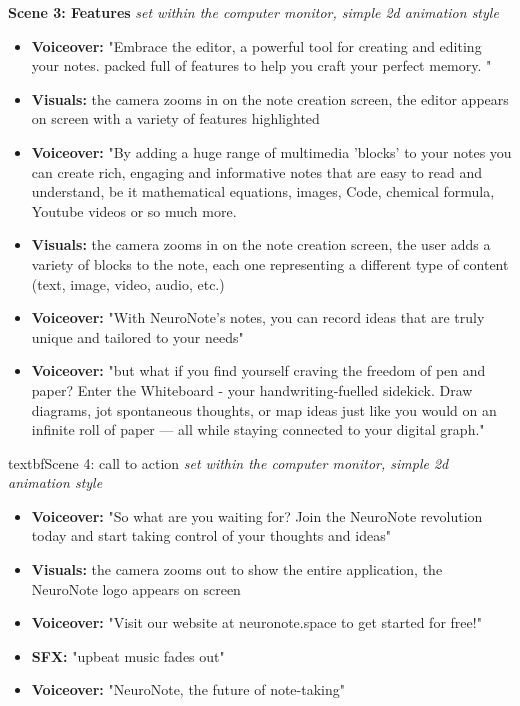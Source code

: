 \textbf{Scene 3: Features}
\textit{set within the computer monitor, simple 2d animation style}
\begin{itemize}
    \item [1:00] \textbf{Voiceover:} "Embrace the editor, a powerful tool for creating and editing your notes. packed full of features to help you craft your perfect memory. "
    \item [1:05] \textbf{Visuals:} the camera zooms in on the note creation screen, the editor appears on screen with a variety of features highlighted
    \item [1:10] \textbf{Voiceover:} "By adding a huge range of multimedia 'blocks' to your notes you can create rich, engaging and informative notes that are easy to read and understand, be it mathematical equations, images, Code, chemical formula, Youtube videos or so much more.
    \item [1:15] \textbf{Visuals:} the camera zooms in on the note creation screen, the user adds a variety of blocks to the note, each one representing a different type of content (text, image, video, audio, etc.)
    \item [1:20] \textbf{Voiceover:} "With NeuroNote's notes, you can record ideas that are truly unique and tailored to your needs"
    \item [1:20] \textbf{Voiceover:} "but what if you find yourself craving the freedom of pen and paper? Enter the Whiteboard - your handwriting-fuelled sidekick. Draw diagrams, jot spontaneous thoughts, or map ideas just like you would on an infinite roll of paper — all while staying connected to your digital graph." 
\end{itemize}

textbf{Scene 4: call to action}
\textit{set within the computer monitor, simple 2d animation style}
\begin{itemize}
    \item [1:30] \textbf{Voiceover:} "So what are you waiting for? Join the NeuroNote revolution today and start taking control of your thoughts and ideas"
    \item [1:35] \textbf{Visuals:} the camera zooms out to show the entire application, the NeuroNote logo appears on screen
    \item [1:40] \textbf{Voiceover:} "Visit our website at neuronote.space to get started for free!"
    \item [1:45] \textbf{SFX:} "upbeat music fades out"
    \item [1:50] \textbf{Voiceover:} "NeuroNote, the future of note-taking"
\end{itemize}

